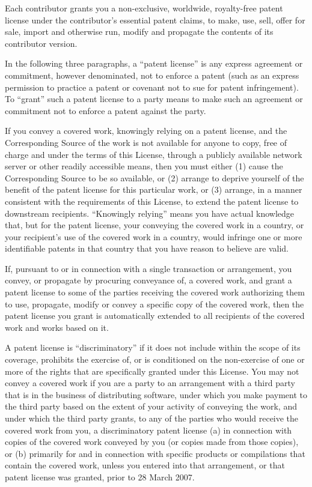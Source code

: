 \documentclass[10pt,a4paper,ngerman,titlepage,tocindentauto]{article}
\begin{document}
\begin{multicols}{3}
{\begin{enumerate}
					Each contributor grants you a non-exclusive, worldwide, royalty-free
					patent license under the contributor's essential patent claims, to
					make, use, sell, offer for sale, import and otherwise run, modify and
					propagate the contents of its contributor version.

					In the following three paragraphs, a ``patent license'' is any express
					agreement or commitment, however denominated, not to enforce a patent
					(such as an express permission to practice a patent or covenant not to
					sue for patent infringement).  To ``grant'' such a patent license to a
					party means to make such an agreement or commitment not to enforce a
					patent against the party.

					If you convey a covered work, knowingly relying on a patent license,
					and the Corresponding Source of the work is not available for anyone
					to copy, free of charge and under the terms of this License, through a
					publicly available network server or other readily accessible means,
					then you must either (1) cause the Corresponding Source to be so
					available, or (2) arrange to deprive yourself of the benefit of the
					patent license for this particular work, or (3) arrange, in a manner
					consistent with the requirements of this License, to extend the patent
					license to downstream recipients.  ``Knowingly relying'' means you have
					actual knowledge that, but for the patent license, your conveying the
					covered work in a country, or your recipient's use of the covered work
					in a country, would infringe one or more identifiable patents in that
					country that you have reason to believe are valid.

					If, pursuant to or in connection with a single transaction or
					arrangement, you convey, or propagate by procuring conveyance of, a
					covered work, and grant a patent license to some of the parties
					receiving the covered work authorizing them to use, propagate, modify
					or convey a specific copy of the covered work, then the patent license
					you grant is automatically extended to all recipients of the covered
					work and works based on it.

					A patent license is ``discriminatory'' if it does not include within
					the scope of its coverage, prohibits the exercise of, or is
					conditioned on the non-exercise of one or more of the rights that are
					specifically granted under this License.  You may not convey a covered
					work if you are a party to an arrangement with a third party that is
					in the business of distributing software, under which you make payment
					to the third party based on the extent of your activity of conveying
					the work, and under which the third party grants, to any of the
					parties who would receive the covered work from you, a discriminatory
					patent license (a) in connection with copies of the covered work
					conveyed by you (or copies made from those copies), or (b) primarily
					for and in connection with specific products or compilations that
					contain the covered work, unless you entered into that arrangement,
					or that patent license was granted, prior to 28 March 2007.


\end{enumerate}}
\end{multicols}
\end{document}
